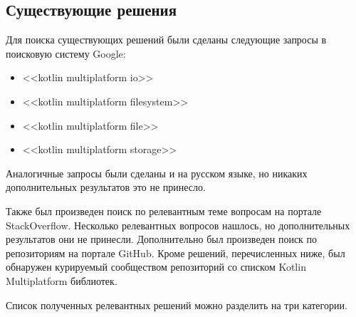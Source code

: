 
\subsection{Существующие решения}
  Для поиска существующих решений были сделаны следующие запросы в поисковую систему Google:
  \begin{itemize}
    \item <<kotlin multiplatform io>>
    \item <<kotlin multiplatform filesystem>>
    \item <<kotlin multiplatform file>>
    \item <<kotlin multiplatform storage>>
  \end{itemize}
  Аналогичные запросы были сделаны и на русском языке, но никаких дополнительных результатов это не принесло.

  Также был произведен поиск по релевантным теме вопросам на портале StackOverflow\cite{stackoverflow}. Несколько релевантных вопросов нашлось\cite{so-file-io-with-kotlin-multiplatform,so-read-write-file-in-kotlin-native-ios-side}, но дополнительных результатов они не принесли.
  Дополнительно был произведен поиск по репозиториям на портале GitHub\cite{github}. Кроме решений, перечисленных ниже, был обнаружен курируемый сообществом репозиторий со списком Kotlin Multiplatform библиотек\cite{gh-kotlin-multiplatform-libs}.

  Список полученных релевантных решений можно разделить на три категории.

  \newcommand{\existingsolution}[3]{\item \textbf{#1}#2\par#3}


